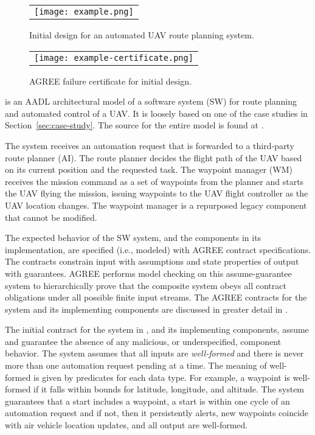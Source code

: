 \begin{figure*}[h]
  \begin{center}
    \begin{tabular}{c}
      \texttt{[image: example.png]}
    \end{tabular}
  \end{center}
\caption{Initial design for an automated UAV route planning system.}
\label{fig:example}
\end{figure*}

\begin{figure}
  \begin{center}
    \begin{tabular}{c}
      \texttt{[image: example-certificate.png]} \\
    \end{tabular}
  \end{center}
\caption{AGREE failure certificate for initial design.}
\label{fig:example-certificate}
\end{figure}

 is an AADL architectural model of a software system (SW) for route planning and automated control of a UAV.
It is loosely based on one of the case studies in Section~\ref{sec:case-study}.
The source for the entire model is found at \cite{repo}.

The system receives an automation request that is forwarded to a third-party route planner (AI).
The route planner decides the flight path of the UAV based on its current position and the requested task.
The waypoint manager (WM) receives the mission command as a set of waypoints from the planner and starts the UAV flying the mission, issuing waypoints to the UAV flight controller as the UAV location changes.
The waypoint manager is a repurposed legacy component that cannot be modified.

The expected behavior of the SW system, and the components in its implementation, are specified (i.e., modeled) with AGREE contract specifications.
The contracts constrain input with assumptions and state properties of output with guarantees.
AGREE performs model checking on this assume-guarantee system to hierarchically prove that the composite system obeys all contract obligations under all possible finite input streams. 
The AGREE contracts for the system and its implementing components are discussed in greater detail in .

The initial contract for the system in , and its implementing components, assume and guarantee the absence of any malicious, or underspecified, component behavior.
The system assumes that all inputs are \emph{well-formed} and there is never more than one automation request pending at a time.
The meaning of well-formed is given by predicates for each data type.
For example, a waypoint is well-formed if it falls within bounds for latitude, longitude, and altitude.
The system guarantees that a start includes a waypoint, a start is within one cycle of an automation request and if not, then it persistently alerts, new waypoints coincide with air vehicle location updates, and all output are well-formed.

